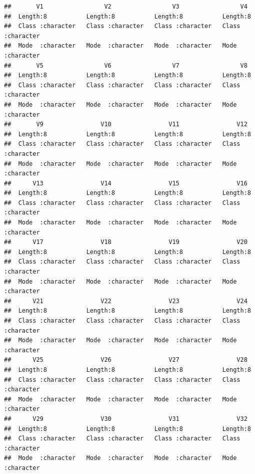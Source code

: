 \documentclass[
]{article}
\begin{document}
\begin{verbatim}
##       V1                 V2                 V3                 V4           
##  Length:8           Length:8           Length:8           Length:8          
##  Class :character   Class :character   Class :character   Class :character  
##  Mode  :character   Mode  :character   Mode  :character   Mode  :character  
##       V5                 V6                 V7                 V8           
##  Length:8           Length:8           Length:8           Length:8          
##  Class :character   Class :character   Class :character   Class :character  
##  Mode  :character   Mode  :character   Mode  :character   Mode  :character  
##       V9                V10                V11                V12           
##  Length:8           Length:8           Length:8           Length:8          
##  Class :character   Class :character   Class :character   Class :character  
##  Mode  :character   Mode  :character   Mode  :character   Mode  :character  
##      V13                V14                V15                V16           
##  Length:8           Length:8           Length:8           Length:8          
##  Class :character   Class :character   Class :character   Class :character  
##  Mode  :character   Mode  :character   Mode  :character   Mode  :character  
##      V17                V18                V19                V20           
##  Length:8           Length:8           Length:8           Length:8          
##  Class :character   Class :character   Class :character   Class :character  
##  Mode  :character   Mode  :character   Mode  :character   Mode  :character  
##      V21                V22                V23                V24           
##  Length:8           Length:8           Length:8           Length:8          
##  Class :character   Class :character   Class :character   Class :character  
##  Mode  :character   Mode  :character   Mode  :character   Mode  :character  
##      V25                V26                V27                V28           
##  Length:8           Length:8           Length:8           Length:8          
##  Class :character   Class :character   Class :character   Class :character  
##  Mode  :character   Mode  :character   Mode  :character   Mode  :character  
##      V29                V30                V31                V32           
##  Length:8           Length:8           Length:8           Length:8          
##  Class :character   Class :character   Class :character   Class :character  
##  Mode  :character   Mode  :character   Mode  :character   Mode  :character  

\end{verbatim}
\end{document}
